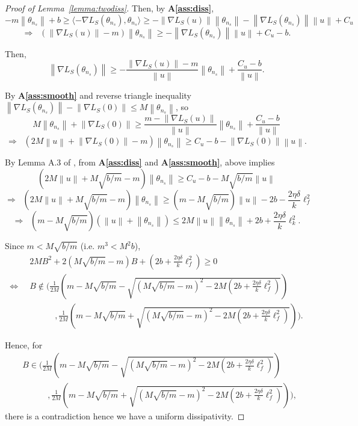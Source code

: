 \documentclass{article}
\newcommand{\norm}[1]{\left\lVert#1\right\rVert} %
\begin{document}
\begin{proof}[Proof of Lemma~\ref{lemma:twodiss}]
    Then, by \textbf{A\ref{ass:diss}}, 
    $$ -m\norm{\theta_{n_s}} + b \geq \langle -\nabla L_S(\theta_{n_s}), \theta_{n_s} \rangle \geq -\norm{\nabla L_S(u)}  \norm{\theta_{n_s}} - \norm{\nabla L_S(\theta_{n_s})} \norm{u} + C_u$$
    $$\Rightarrow\;\; (\norm{\nabla L_S(u)} -m) \norm{\theta_{n_s}} \geq - \norm{\nabla L_S(\theta_{n_s})} \norm{u} + C_u - b.$$

    Then,
    $$\norm{\nabla L_S(\theta_{n_s})} \geq -\frac{\norm{\nabla L_S(u)} -m}{\norm{u}} \norm{\theta_{n_s}} + \frac{C_u-b}{\norm{u}}. $$

    By \textbf{A\ref{ass:smooth}} and reverse triangle inequality $\norm{\nabla L_S(\theta_{n_s})} - \norm{\nabla L_S(0)} \leq M\norm{\theta_{n_s}}$, so
    $$M\norm{\theta_{n_s}} + \norm{\nabla L_S(0)}\geq \frac{m - \norm{\nabla L_S(u)} }{\norm{u}} \norm{\theta_{n_s}} + \frac{C_u-b}{\norm{u}}$$
    $$\Rightarrow\;\;(2M\norm{u} + \norm{\nabla L_S(0)} -m ) \norm{\theta_{n_s}} \geq C_u - b - \norm{\nabla L_S(0)}\norm{u}. $$

    By Lemma A.3 of \citet{Farghly}, from \textbf{A\ref{ass:diss}} and \textbf{A\ref{ass:smooth}}, above implies
    $$(2M\norm{u} + M \sqrt{b/m} -m ) \norm{\theta_{n_s}} \geq C_u - b - M \sqrt{b/m} \norm{u} $$
    $$\Rightarrow\;\;(2M\norm{u} + M \sqrt{b/m} -m ) \norm{\theta_{n_s}} \geq (m - M \sqrt{b/m})\norm{u} - 2b - \frac{2 \eta \delta}{k} \ell_f^2 $$
    $$\Rightarrow\;\; (m-M\sqrt{b/m})(\norm{u} + \norm{\theta_{n_s}}) \leq 2M\norm{u}\norm{\theta_{n_s}} + 2b + \frac{2\eta\delta}{k}\ell_k^2.$$

    Since $m < M\sqrt{b/m}$ (i.e. $m^3 < M^2 b$),
    \begin{align*}
        & 2MB^2 + 2(M\sqrt{b/m}-m)B + (2b+\frac{2\eta\delta}{k} \ell_f^2) \geq 0 \\
        \iff \;\; & B \notin \Bigg(\frac{1}{2M}\left(m-M\sqrt{b/m} - \sqrt{(M\sqrt{b/m}-m)^2 - 2M(2b+\frac{2\eta\delta}{k} \ell_f^2)}\right)\\
        &\quad\quad\quad , \frac{1}{2M}\left(m-M\sqrt{b/m} + \sqrt{(M\sqrt{b/m}-m)^2 - 2M(2b+\frac{2\eta\delta}{k} \ell_f^2)}\right) \Bigg).
    \end{align*}

    Hence, for
    \begin{align*}
        &B \in \Bigg(\frac{1}{2M}\left(m-M\sqrt{b/m} - \sqrt{(M\sqrt{b/m}-m)^2 - 2M(2b+\frac{2\eta\delta}{k} \ell_f^2)}\right)\\
        &\quad\quad\quad , \frac{1}{2M}\left(m-M\sqrt{b/m} + \sqrt{(M\sqrt{b/m}-m)^2 - 2M(2b+\frac{2\eta\delta}{k} \ell_f^2)}\right) \Bigg),
    \end{align*}
    there is a contradiction hence we have a uniform dissipativity.
\end{proof}
\end{document}
